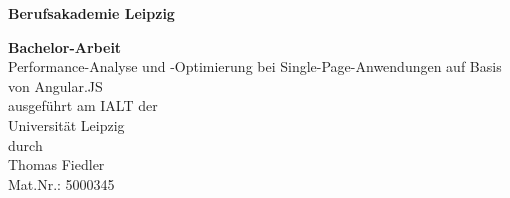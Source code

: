 \begin{titlepage}

\begin{center}
{\Large \bfseries Berufsakademie Leipzig}

\vspace{1,0cm}
\sffamily
{\LARGE \bfseries Bachelor-Arbeit}\\
\vspace{1,5cm}
{\Huge  {}\selectfont  Performance-Analyse und -Optimierung bei
Single-Page-Anwendungen auf Basis von Angular.JS}\\
\vspace{2,0cm}
\vspace{4,0cm}
\small
ausgeführt am IALT der\\
Universität Leipzig\\
\vspace{1,0cm}
durch\\
\vspace{,2cm}
Thomas Fiedler \\
Mat.Nr.: 5000345\\
\vspace{,5cm}

\end{center}

\end{titlepage}
